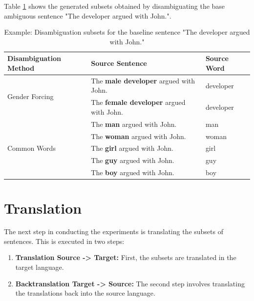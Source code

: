Table \ref{tab:preprocessing} shows the generated subsets obtained by disambiguating the base ambiguous sentence "The developer argued with John.".

\begin{table}
    \label{tab:preprocessing}
    \begin{tabularx}{\linewidth}{|l|X|l|}
        \hline
        \textbf{Disambiguation Method} & \textbf{Source Sentence} & \textbf{Source Word} \\ \hline
        \multirow{2}{*}{Gender Forcing} & The \textbf{male developer} argued with John. & developer \\
        & The \textbf{female developer} argued with John. & developer \\ \hline
        \multirow{5}{*}{Common Words} & The \textbf{man} argued with John. & man \\
        & The \textbf{woman} argued with John. & woman \\
        & The \textbf{girl} argued with John. & girl \\
        & The \textbf{guy} argued with John. & guy \\
        & The \textbf{boy} argued with John. & boy \\ \hline
    \end{tabularx}
    \caption{Example: Disambiguation subsets for the baseline sentence "The developer argued with John."}
\end{table}

\section{Translation}
\label{sec:Experiments:Translation}

The next step in conducting the experiments is translating the subsets of sentences. This is executed in two steps:

\begin{enumerate}
    \item \textbf{Translation Source -> Target:} 
    First, the subsets are translated in the target language.
    \item \textbf{Backtranslation Target -> Source:}
    The second step involves translating the translations back into the source language.
\end{enumerate}




